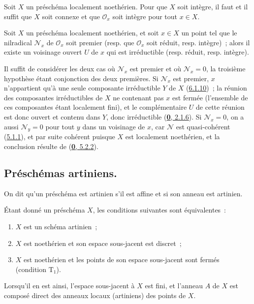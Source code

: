 \begin{corollary}[6.1.12]
\label{I.6.1.12-fr}
Soit $X$ un préschéma localement noethérien. Pour que $X$ soit intègre, il
faut et il suffit que $X$ soit connexe et que $\mathscr{O}_x$ soit intègre
pour tout $x\in X$.
\end{corollary}

\begin{proposition}[6.1.13]
\label{I.6.1.13-fr}
Soit $X$ un préschéma localement noethérien, et soit $x\in X$ un point tel que
le nilradical $\mathscr{N}_x$ de $\mathscr{O}_x$ soit premier \textup{(resp.} que
$\mathscr{O}_x$ soit réduit, \textup{resp.} intègre)~; alors il existe un voisinage
ouvert $U$ de $x$ qui est irréductible \textup{(resp.} réduit, \textup{resp.} intègre).
\end{proposition}

Il suffit de considérer les deux cas où $\mathscr{N}_x$ est premier et où
$\mathscr{N}_x=0$, la troisième hypothèse étant conjonction des deux
premières. Si $\mathscr{N}_x$ est premier, $x$ n'appartient qu'à une seule
composante irréductible $Y$ de $X$ (\hyperref[I.6.1.10-fr]{6.1.10})~; la
réunion des composantes irréductibles de $X$ ne contenant pas $x$ est fermée
(l'ensemble de ces composantes étant localement fini), et le complémentaire
$U$ de cette réunion est donc ouvert et contenu dans $Y$, donc irréductible
(\hyperref[0.2.1.6-fr]{\textbf{0}, 2.1.6}). Si $\mathscr{N}_x=0$, on a aussi
$\mathscr{N}_y=0$ pour tout $y$ dans un voisinage de $x$, car $\mathscr{N}$
est quasi-cohérent (\hyperref[I.5.1.1-fr]{5.1.1}), et par suite cohérent
puisque $X$ est localement noethérien, et la conclusion résulte de
(\hyperref[0.5.2.2-fr]{\textbf{0}, 5.2.2}).

\subsection{Préschémas artiniens.}
\label{subsection:I.6.2-fr}

\begin{definition}[6.2.1]
\label{I.6.2.1-fr}
On dit qu'un préschéma est artinien s'il est affine et si son anneau
est artinien.
\end{definition}

\begin{proposition}[6.2.2]
\label{I.6.2.2-fr}
Étant donné un préschéma $X$, les conditions suivantes sont équivalentes~:
\begin{enumerate}
  \item[a)] $X$ est un schéma artinien~;
  \item[b)] $X$ est noethérien et son espace sous-jacent est discret~;
  \item[c)] $X$ est noethérien et les points de son espace sous-jacent sont
    fermés \textup{(condition $\mathrm{T}_1$)}.
\end{enumerate}

Lorsqu'il en est ainsi, l'espace sous-jacent à $X$ est fini, et l'anneau $A$
de $X$ est composé direct des anneaux locaux (artiniens) des points de $X$.
\end{proposition}

